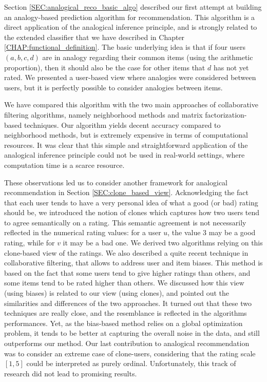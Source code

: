 Section \ref{SEC:analogical_reco_basic_algo} described our first attempt at
building an analogy-based prediction algorithm for recommendation. This
algorithm is a direct application of the analogical inference principle, and is
strongly related to the extended classifier that we have described in Chapter
\ref{CHAP:functional_definition}. The basic underlying idea is that if four
users $(a, b, c, d)$ are in analogy regarding their common items (using the
arithmetic proportion), then it should also be the case for other items that
$d$ has not yet rated. We presented a user-based view where analogies were
considered between users, but it is perfectly possible to consider analogies
between items.

We have compared this algorithm with the two main approaches of collaborative
filtering algorithms, namely neighborhood methods and matrix
factorization-based techniques. Our algorithm yields decent accuracy compared
to neighborhood methods, but is extremely expensive in terms of computational
resources.  It was clear that this simple and straightforward application of
the analogical inference principle could not be used in real-world settings,
where computation time is a scarce resource.

These observations led us to consider another framework for analogical
recommendation in Section \ref{SEC:clone_based_view}. Acknowledging the fact
that each user tends to have a very
personal idea of what a good (or bad) rating should be, we introduced the notion of clones
which captures how two users tend to agree semantically on a rating. This
semantic agreement is not necessarily reflected in the numerical rating values:
for a user $u$, the value 3 may
be a good rating, while for $v$ it may be a bad one. We derived two algorithms
relying on this clone-based view of the ratings. We also described a quite
recent technique in collaborative filtering, that allows to address user and
item biases. This method is based on the fact that some users tend to give
higher ratings than others, and some items tend to be rated higher than others.
We discussed how this view (using biases) is related to our view (using
clones), and pointed out the similarities and differences of the two
approaches. It turned out that these two techniques are really close, and the
resemblance is reflected in the algorithms performances. Yet, as the bias-based
method relies on a global optimization problem, it tends to be better at
capturing the overall noise in the data, and still outperforms our method. Our
last contribution to analogical recommendation was to consider an extreme case
of clone-users, considering that the rating scale $[1, 5]$ could be interpreted
as purely ordinal. Unfortunately, this track of research did not lead to
promising results.

